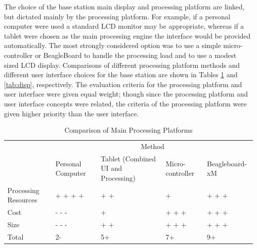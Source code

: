 \documentclass[11pt]{article} %
\begin{document}
\quad \newline
The choice of the base station main display and processing platform are linked, but dictated mainly by the processing platform. For example, if a personal computer were used a standard LCD monitor may be appropriate, whereas if a tablet were chosen as the main processing engine the interface would be provided automatically. The most strongly considered option was to use a simple micro-controller or BeagleBoard to handle the processing load and to use a modest sized LCD display. Comparisons of different processing platform methods and different user interface choices for the base station are shown in Tables \ref{tab:proc} and \ref{tab:disp}, respectively. The evaluation criteria for the processing platform and user interface were given equal weight; though since the processing platform and user interface concepts were related, the criteria of the processing platform were given higher priority than the user interface.
\begin{table}[h!]
\caption{Comparison of Main Processing Platforms}
\begin{tabular}{| p{1.5in} | p{.75in} | p{1.3in} | p{0.75in} | p{1.15in} | }
\cline{2-5}
\multicolumn{1}{c}{}&\multicolumn{4}{|c|}{Method} \\
\cline{2-5}
\multicolumn{1}{c|}{}&Personal \newline Computer&Tablet (Combined \newline UI and Processing)&Micro-controller & Beagleboard-xM\\
\hline
Processing Resources&+ + + +&+ +&+&+ + +\\
\hline
Cost &- - -& + &+ + +&+ + +\\
\hline
Size&- - -&+ +&+ + +& + + +\\
\hline
\hline
Total &2-&5+&7+& 9+\\
\hline
\end{tabular}
\label{tab:proc}
\end{table}
\end{document}
